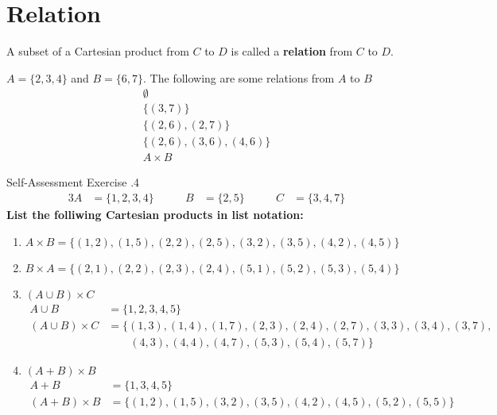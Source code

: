 \documentclass[../notes.tex]{subfiles}
\begin{document}
		\section{Relation}
			A subset of a Cartesian product from $C$ to $D$ is called a \textbf{relation} from $C$ to $D$.
			\begin{examplebox}
				$A = \{2, 3, 4\}$ and  $B = \{6, 7\}$. The following are some relations from $A$ to $B$
				\begin{align*}
					\emptyset \tag*{(This is a subset, even though it has no elements)}\\
					\bigl\{(3, 7)\bigr\}\\
					\bigl\{(2, 6), (2, 7)\bigr\}\\
					\bigl\{(2, 6), (3, 6), (4, 6)\bigr\}\\
					A \times B
				\end{align*}
				\pagebreak
			\end{examplebox}
				\begin{exercisebox}{Self-Assessment Exercise \thechapter.4}
					\begin{alignat*}{3}
						A &= \{1, 2, 3, 4\} \qquad & B &= \{2, 5\} \qquad & C &= \{3, 4, 7\}
					\end{alignat*}
					\textbf{List the folliwing Cartesian products in list notation:}
					\begin{enumerate}[label=(\alph*)]
						\item $A \times B = \bigl\{(1, 2), (1, 5), (2, 2), (2, 5), (3, 2), (3, 5), (4, 2), (4, 5)\bigr\}$
						\item $B \times A = \bigl\{(2, 1), (2, 2), (2, 3), (2, 4), (5, 1), (5, 2), (5, 3), (5, 4)\bigr\}$
						\item $(A \cup B) \times C$
							\begin{align*}
								A \cup B &= \{1, 2, 3, 4, 5\}\\
								(A \cup B) \times C &= \bigl\{(1, 3), (1, 4), (1, 7), (2, 3), (2, 4), (2, 7), (3, 3), (3, 4), (3, 7),\\
								& \qquad (4, 3), (4, 4), (4, 7), (5, 3), (5, 4), (5, 7)\bigr\}
							\end{align*}
						\item $(A + B) \times B$
							\begin{align*}
								A + B &= \{1, 3, 4, 5\}\\
								(A + B) \times B &= \bigl\{(1, 2), (1, 5), (3, 2), (3, 5), (4, 2), (4, 5), (5, 2), (5, 5)\bigr\}
							\end{align*}
					\end{enumerate}
				\end{exercisebox}
				\pagebreak
\end{document}
